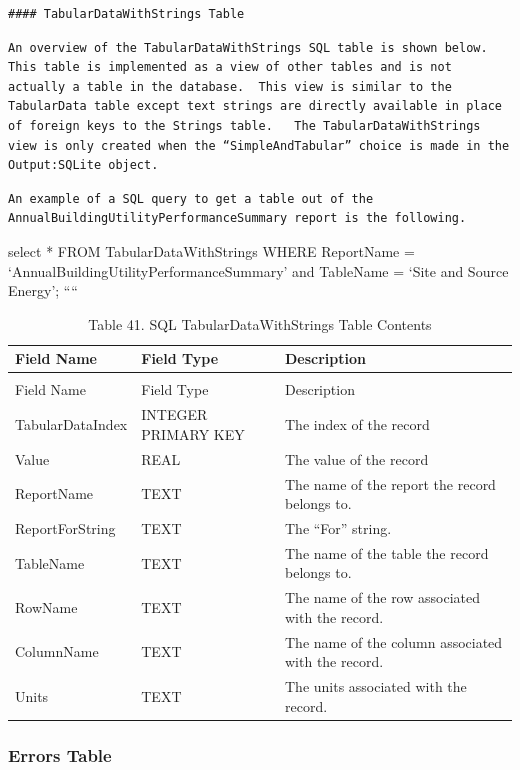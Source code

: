 \begin{lstlisting}
#### TabularDataWithStrings Table
\end{lstlisting}

\begin{lstlisting}
An overview of the TabularDataWithStrings SQL table is shown below.  This table is implemented as a view of other tables and is not actually a table in the database.  This view is similar to the TabularData table except text strings are directly available in place of foreign keys to the Strings table.   The TabularDataWithStrings view is only created when the “SimpleAndTabular” choice is made in the Output:SQLite object.
\end{lstlisting}

\begin{lstlisting}
An example of a SQL query to get a table out of the AnnualBuildingUtilityPerformanceSummary report is the following.
\end{lstlisting}

select * FROM TabularDataWithStrings WHERE ReportName = `AnnualBuildingUtilityPerformanceSummary' and TableName = `Site and Source Energy'; ````

\begin{longtable}[c]{p{1.5in}p{1.5in}p{3.0in}}
\caption{Table 41. SQL TabularDataWithStrings Table Contents \label{table:table-41.-sql-tabulardatawithstrings-table}} \tabularnewline
\toprule 
Field Name & Field Type & Description \tabularnewline
\midrule
\endfirsthead

\caption[]{Table 41. SQL TabularDataWithStrings Table Contents} \tabularnewline
\toprule 
Field Name & Field Type & Description \tabularnewline
\midrule
\endhead

TabularDataIndex & INTEGER PRIMARY KEY & The index of the record \tabularnewline
Value & REAL & The value of the record \tabularnewline
ReportName & TEXT & The name of the report the record belongs to. \tabularnewline
ReportForString & TEXT & The “For” string. \tabularnewline
TableName & TEXT & The name of the table the record belongs to. \tabularnewline
RowName & TEXT & The name of the row associated with the record. \tabularnewline
ColumnName & TEXT & The name of the column associated with the record. \tabularnewline
Units & TEXT & The units associated with the record. \tabularnewline
\bottomrule
\end{longtable}

\subsubsection{Errors Table}\label{errors-table}

